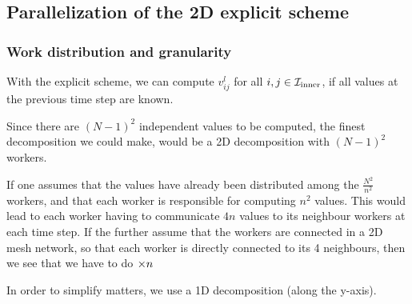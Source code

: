 \subsection{Parallelization of the 2D explicit scheme}
\subsubsection{Work distribution and granularity}
\cite{inf3380_bok}
With the explicit scheme, we can compute $v_{ij}^l$ for all $i, j \in \mathcal{I}_{\mathrm{inner}}$, if all values at the previous time step are known.

Since there are $(N - 1)^2$ independent values to be computed, the finest decomposition we could make, would be a 2D decomposition with $(N - 1)^2$ workers.

If one assumes that the values have already been distributed among the $\frac{N^2}{n^2}$ workers, and that each worker is responsible for computing $n^2$ values. This would lead to each worker having to communicate $4n$ values to its neighbour workers at each time step. If the further assume that the workers are connected in a 2D mesh network, so that each worker is directly connected to its 4 neighbours, then we see that we have to do $\mathcal{\Theta}{n}$

In order to simplify matters, we use a 1D decomposition (along the y-axis).
